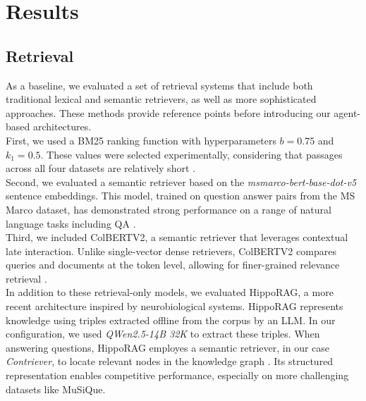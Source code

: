 \cleardoublepage
\chapter{Results}
\label{ch:results}
\label{ch:chapter4}

\section{Retrieval}

As a baseline, we evaluated a set of retrieval systems that include both traditional lexical and semantic retrievers, as well as more sophisticated approaches. These methods provide reference points before introducing our agent-based architectures.\\

\noindent First, we used a BM25 ranking function with hyperparameters $b = 0.75$ and $k_1 = 0.5$. These values were selected experimentally, considering that passages across all four datasets are relatively short \cite{10.1145/2682862.2682863}. \\

\noindent Second, we evaluated a semantic retriever based on the \textit{msmarco-bert-base-dot-v5} sentence embeddings. This model, trained on question answer pairs from the MS Marco dataset, has demonstrated strong performance on a range of natural language tasks including QA \cite{reimers-2019-sentence-bert}. \\

\noindent Third, we included ColBERTV2, a semantic retriever that leverages contextual late interaction. Unlike single-vector dense retrievers, ColBERTV2 compares queries and documents at the token level, allowing for finer-grained relevance retrieval \cite{santhanam-etal-2022-colbertv2}.\\

\noindent In addition to these retrieval-only models, we evaluated HippoRAG, a more recent architecture inspired by neurobiological systems. HippoRAG represents knowledge using triples extracted offline from the corpus by an LLM. In our configuration, we used \textit{QWen2.5-14B 32K} to extract these triples. When answering questions, HippoRAG employes a semantic retriever, in our case \textit{Contriever}, to locate relevant nodes in the knowledge graph \cite{NEURIPS2024_6ddc001d}. Its structured representation enables competitive performance, especially on more challenging datasets like MuSiQue. \\


